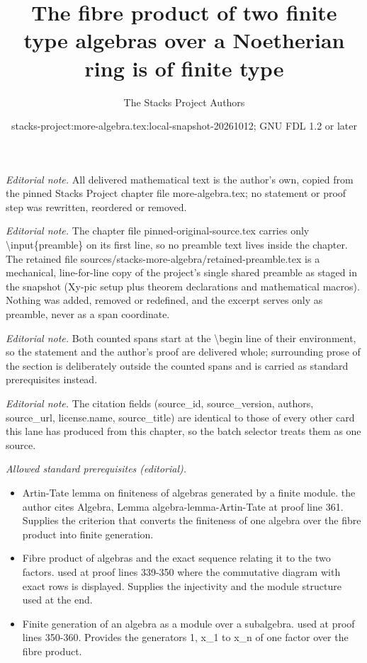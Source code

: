 \documentclass[10pt,a4paper]{amsart}
\title{The fibre product of two finite type algebras over a Noetherian ring is of finite type}
\author{The Stacks Project Authors}
\date{stacks-project:more-algebra.tex:local-snapshot-20261012; GNU FDL 1.2 or later}
\theoremstyle{plain}
\theoremstyle{definition}
\theoremstyle{remark}
\numberwithin{equation}{subsection}
\begin{document}
\maketitle
\setcounter{subsection}{1}
\noindent\textit{Editorial note.} All delivered mathematical text is the author's own, copied from the pinned Stacks Project chapter file more-algebra.tex; no statement or proof step was rewritten, reordered or removed.\par\medskip
\noindent\textit{Editorial note.} The chapter file pinned-original-source.tex carries only \textbackslash{}input\{preamble\} on its first line, so no preamble text lives inside the chapter. The retained file sources/stacks-more-algebra/retained-preamble.tex is a mechanical, line-for-line copy of the project's single shared preamble as staged in the snapshot (Xy-pic setup plus theorem declarations and mathematical macros). Nothing was added, removed or redefined, and the excerpt serves only as preamble, never as a span coordinate.\par\medskip
\noindent\textit{Editorial note.} Both counted spans start at the \textbackslash{}begin line of their environment, so the statement and the author's proof are delivered whole; surrounding prose of the section is deliberately outside the counted spans and is carried as standard prerequisites instead.\par\medskip
\noindent\textit{Editorial note.} The citation fields (source\_id, source\_version, authors, source\_url, license.name, source\_title) are identical to those of every other card this lane has produced from this chapter, so the batch selector treats them as one source.\par\medskip
\noindent\textit{Allowed standard prerequisites (editorial).}\begin{itemize}
\item Artin-Tate lemma on finiteness of algebras generated by a finite module. the author cites Algebra, Lemma algebra-lemma-Artin-Tate at proof line 361. Supplies the criterion that converts the finiteness of one algebra over the fibre product into finite generation.
\item Fibre product of algebras and the exact sequence relating it to the two factors. used at proof lines 339-350 where the commutative diagram with exact rows is displayed. Supplies the injectivity and the module structure used at the end.
\item Finite generation of an algebra as a module over a subalgebra. used at proof lines 350-360. Provides the generators 1, x\_1 to x\_n of one factor over the fibre product.
\end{itemize}\medskip
\end{document}
